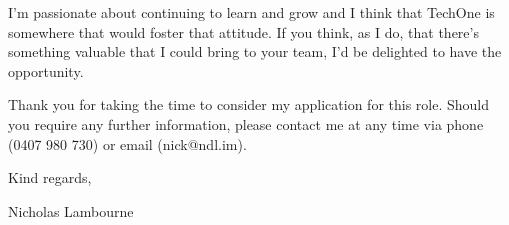 \documentclass[a4paper]{article}
\begin{document}
\vspace{18pt}

I'm passionate about continuing to learn and grow and I think that TechOne is somewhere that would foster that attitude. If you think, as I do, that there's something valuable that I could bring to your team, I'd be delighted to have the opportunity. 

\vspace{18pt}

Thank you for taking the time to consider my application for this role. Should you require any further information, please contact me at any time via phone (0407 980 730) or email (nick@ndl.im).

\vspace{30pt}

Kind regards, \\

\vspace{18pt}

Nicholas Lambourne
\end{document}

